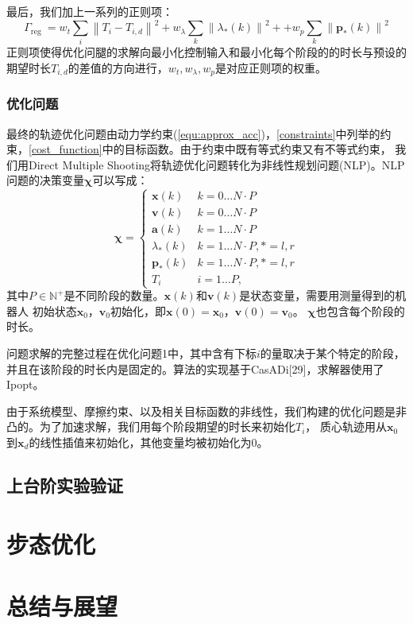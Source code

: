 最后，我们加上一系列的正则项：
\begin{equation}
    \label{equ:cost_4}
    \Gamma_{\text {reg }}=  w_t \sum_i\left\|T_i-T_{i, d}\right\|^2+w_\lambda \sum_k\left\|\lambda_*(k)\right\|^2+ 
        +w_p \sum_k\left\|\boldsymbol{p}_*(k)\right\|^2
\end{equation}
正则项使得优化问腿的求解向最小化控制输入和最小化每个阶段的的时长与预设的期望时长$T_{i, d}$的差值的方向进行，$w_t, w_\lambda, w_p$是对应正则项的权重。

\subsection{优化问题}
最终的轨迹优化问题由动力学约束(\autoref{equ:approx_acc})，\autoref{constraints}中列举的约束，\autoref{cost_function}中的目标函数。由于约束中既有等式约束又有不等式约束，
我们用Direct Multiple Shooting将轨迹优化问题转化为非线性规划问题(NLP)。NLP问题的决策变量$\boldsymbol{\chi}$可以写成：
\begin{equation}
    \label{equ:decision_variable}
    \boldsymbol{\chi} = \begin{cases}\boldsymbol{x}(k) & k=0 \ldots N \cdot P \\ \boldsymbol{v}(k) & k=0 \ldots N \cdot P \\ \boldsymbol{a}(k) & k=1 \ldots N \cdot P \\ \lambda_*(k) & k=1 \ldots N \cdot P, *=l, r \\ \boldsymbol{p}_*(k) & k=1 \ldots N \cdot P, *=l, r \\ T_i & i=1 \ldots P,\end{cases}
\end{equation}
其中$P \in \mathbb{N}^+$是不同阶段的数量。$\boldsymbol{x}(k)$和$\boldsymbol{v}(k)$是状态变量，需要用测量得到的机器人
初始状态$\boldsymbol{x}_0$，$\boldsymbol{v}_0$初始化，即$\boldsymbol{x}(0)=\boldsymbol{x}_0$，$\boldsymbol{v}(0)=\boldsymbol{v}_0$。
$\boldsymbol{\chi}$也包含每个阶段的时长。

问题求解的完整过程在优化问题1中，其中含有下标$i$的量取决于某个特定的阶段，并且在该阶段的时长内是固定的。算法的实现基于CasADi[29]，求解器使用了Ipopt。

由于系统模型、摩擦约束、以及相关目标函数的非线性，我们构建的优化问题是非凸的。为了加速求解，我们用每个阶段期望的时长来初始化$T_i$，
质心轨迹用从$\boldsymbol{x}_0$到$\boldsymbol{x}_d$的线性插值来初始化，其他变量均被初始化为0。

\section{上台阶实验验证}
\label{stair_experiment}

\chapter{步态优化}


\chapter{总结与展望}